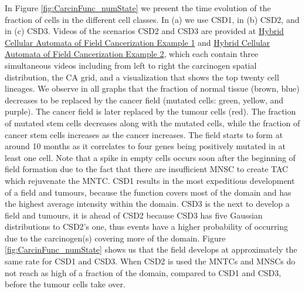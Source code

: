 \documentclass[\main/thesis.tex]{subfiles}
\begin{document}
In Figure \ref{fig:CarcinFunc_numState} we present the time evolution of the fraction of cells in the different cell classes. In (a) we use CSD1, in (b) CSD2, and in (c) CSD3. Videos of the scenarios CSD2 and CSD3 are provided at \href{https://youtu.be/eKxsrSoDiKs}{Hybrid Cellular Automata of Field Cancerization Example 1} and \href{https://youtu.be/Gtf6MoxXCkM}{Hybrid Cellular Automata of Field Cancerization Example 2}, which each contain three simultaneous videos including from left to right the carcinogen spatial distribution, the CA grid, and a visualization that shows the top twenty cell lineages. We observe in all graphs that the fraction of normal tissue (brown, blue) decreases to be replaced by the cancer field (mutated cells: green, yellow, and purple). The cancer field is later replaced by the tumour cells (red). The fraction of mutated stem cells decreases along with the mutated cells, while the fraction of cancer stem cells increases as the cancer increases. The field starts to form at around 10 months as it correlates to four genes being positively mutated in at least one cell. Note that a spike in empty cells occurs soon after the beginning of field formation due to the fact that there are insufficient MNSC to create TAC which rejuvenate the MNTC. CSD1 results in the most expeditious development of a field and tumours, because the function covers most of the domain and has the highest average intensity within the domain. CSD3 is the next to develop a field and tumours, it is ahead of CSD2 because CSD3 has five Gaussian distributions to CSD2's one, thus events have a higher probability of occurring due to the carcinogen(s) covering more of the domain. Figure \ref{fig:CarcinFunc_numState} shows us that the field develops at approximately the same rate for CSD1 and CSD3. When CSD2 is used the MNTCs and MNSCs do not reach as high of a fraction of the domain, compared to CSD1 and CSD3, before the tumour cells take over. 
\end{document}
